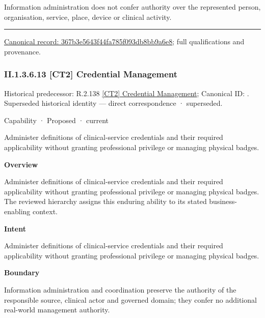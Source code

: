 Information administration does not confer authority over the represented person, organisation, service, place, device or clinical activity.



\medskip\hrule\medskip

{\footnotesize \href{../../../../continuum/strategy/capability/367b3e5643f44fa785f093db8bb9a6e8.md}{Canonical record: 367b3e5643f44fa785f093db8bb9a6e8}; full qualifications and provenance.}\par
\subsubsection*{II.1.3.6.13 [CT2] Credential Management}
\label{navigation:II.1.3.6.13}

{\small Historical predecessor: R.2.138 \hyperref[element:bab3d0ab6eb748978b962ea20fb31640]{[CT2] Credential Management}; Canonical ID: \texttt{}. Superseded historical identity — direct correspondence · superseded.}\par
\label{element:21eed4fc8c924496b16c6ddaa32f3d01}
{\small Capability · Proposed · current}\par

Administer definitions of clinical-service credentials and their required applicability without granting professional privilege or managing physical badges.



\textbf{Overview}



Administer definitions of clinical-service credentials and their required applicability without granting professional privilege or managing physical badges. The reviewed hierarchy assigns this enduring ability to its stated business-enabling context.



\textbf{Intent}



Administer definitions of clinical-service credentials and their required applicability without granting professional privilege or managing physical badges.



\textbf{Boundary}



Information administration and coordination preserve the authority of the responsible source, clinical actor and governed domain; they confer no additional real-world management authority.


